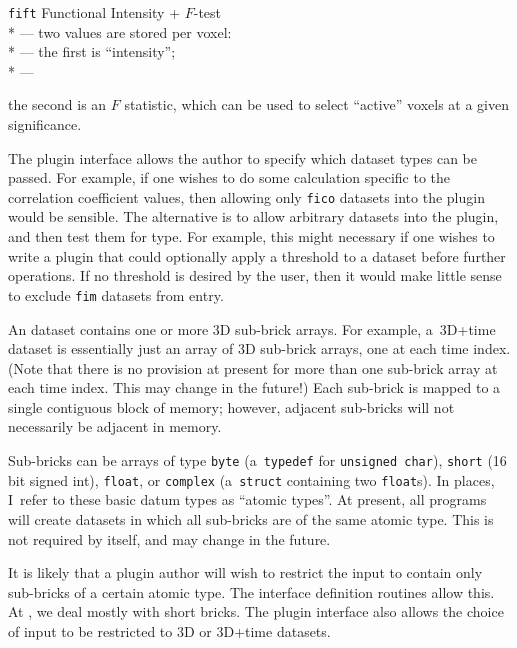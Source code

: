 \begin{tabbing}
        \> {\tt fift} \> Functional Intensity + $F$-test\\*
        \>             \> --- two values are stored per voxel:\\*
        \>             \> --- the first is ``intensity''; \\*
        \>             \> --- \parbox[t]{4.5in}{
                              the second is an $F$ statistic, which
                              can be used to select ``active'' voxels
                              at a given significance.}
\end{tabbing}
    The plugin interface allows the author to specify which dataset
    types can be passed.  For example, if one wishes to do some
    calculation specific to the correlation coefficient values,
    then allowing only {\tt fico} datasets into the plugin would be sensible.
    The alternative is to allow arbitrary datasets into the plugin,
    and then test them for type.  For example, this might necessary if one wishes
    to write a plugin that could optionally apply a threshold
    to a dataset before further operations.  If no threshold is desired
    by the user, then it would make little sense to exclude {\tt fim}
    datasets from entry.

    An \afnit dataset contains one or more 3D sub-brick arrays.
    For example, a~3D+time dataset is essentially just an array of 3D sub-brick arrays,
    one at each time index.
    (Note that there is no provision at present for more than one
    sub-brick array at each time index.  This may change in the future!)
    Each sub-brick is mapped to a single contiguous block of memory; however,
    adjacent sub-bricks will not necessarily be adjacent in memory.

    Sub-bricks can be arrays of type {\tt byte} (a~{\tt typedef} for
    {\tt unsigned char}), {\tt short}
    (16 bit signed int), {\tt float}, or {\tt complex} (a~{\tt struct} containing
    two {\tt float}s).  In places, I~refer to these basic datum types as
    ``atomic types''.  At present, all \mcwafni programs will create datasets
    in which all sub-bricks are of the same atomic type.
    This is not required by \afnit itself, and may change in the future.

    It is likely that a plugin author will wish to restrict
    the input to contain only sub-bricks of a certain atomic type.
    The interface definition routines allow this.  At \MCW, we deal
    mostly with short bricks.
    The plugin interface also allows the choice of input to
    be restricted to 3D or 3D+time datasets.

